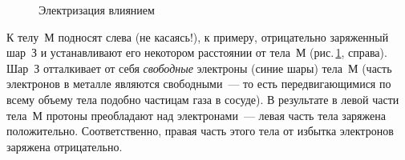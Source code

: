 \documentclass[main.tex]{subfiles}
\begin{document}
\begin{NoHyper}
\begin{enumerate}
\begin{figure}[H]
\caption{Электризация влиянием}
\label{fig:p92}
\end{figure}
\nointerlineskip

    К телу~М подносят слева (не касаясь!), к примеру, отрицательно заряженный шар~З и устанавливают его некотором расстоянии от тела~М (рис.\,\ref{fig:p92}, справа). Шар~З отталкивает от себя \emph{свободные} электроны (синие шары) тела~М (часть электронов в металле являются свободными~--- то есть передвигающимися по всему объему тела подобно частицам газа в сосуде). 
    В результате в левой части тела~М протоны преобладают над электронами~--- левая часть тела заряжена положительно. Соответственно, правая часть этого тела от избытка электронов заряжена отрицательно. 

    
\end{enumerate}



























\end{NoHyper}
\end{document}
